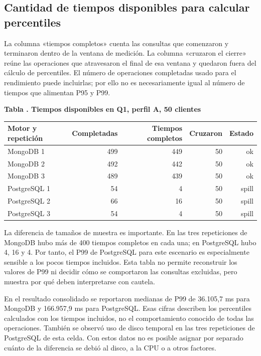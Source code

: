 \documentclass[12pt,letterpaper]{article}
\begin{document}
\subsection*{Cantidad de tiempos disponibles para calcular percentiles}
La columna «tiempos completos» cuenta las consultas que comenzaron y terminaron dentro de la ventana de medición. La columna «cruzaron el cierre» reúne las operaciones que atravesaron el final de esa ventana y quedaron fuera del cálculo de percentiles. El número de operaciones completadas usado para el rendimiento puede incluirlas; por ello no es necesariamente igual al número de tiempos que alimentan P95 y P99.

\par\begin{minipage}{\textwidth}\begin{center}\textbf{Tabla \thetable. Tiempos disponibles en Q1, perfil A, 50 clientes}\par\small
\begin{tabular}{lrrrr}\toprule
Motor y repetición & Completadas & Tiempos completos & Cruzaron & Estado \\ \midrule
MongoDB 1 & 499 & 449 & 50 & ok \\
MongoDB 2 & 492 & 442 & 50 & ok \\
MongoDB 3 & 489 & 439 & 50 & ok \\
PostgreSQL 1 & 54 & 4 & 50 & spill \\
PostgreSQL 2 & 66 & 16 & 50 & spill \\
PostgreSQL 3 & 54 & 4 & 50 & spill \\
\bottomrule\end{tabular}\end{center}\end{minipage}\par

La diferencia de tamaños de muestra es importante. En las tres repeticiones de MongoDB hubo más de 400 tiempos completos en cada una; en PostgreSQL hubo 4, 16 y 4. Por tanto, el P99 de PostgreSQL para este escenario es especialmente sensible a los pocos tiempos incluidos. Esta tabla no permite reconstruir los valores de P99 ni decidir cómo se comportaron las consultas excluidas, pero muestra por qué deben interpretarse con cautela.

En el resultado consolidado se reportaron medianas de P99 de 36.105,7 ms para MongoDB y 166.957,9 ms para PostgreSQL. Esas cifras describen los percentiles calculados con los tiempos incluidos, no el comportamiento conocido de todas las operaciones. También se observó uso de disco temporal en las tres repeticiones de PostgreSQL de esta celda. Con estos datos no es posible asignar por separado cuánto de la diferencia se debió al disco, a la CPU o a otros factores.
\end{document}
